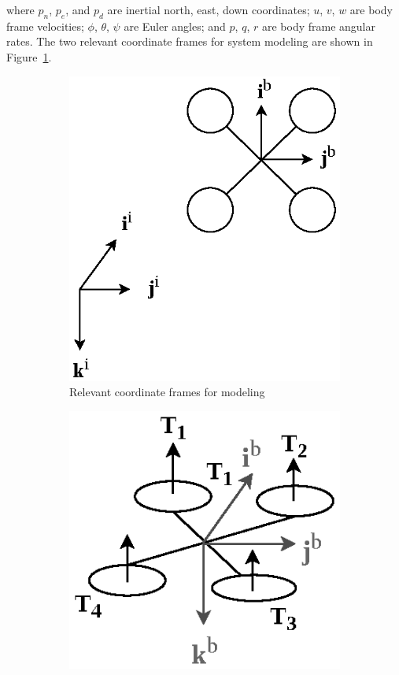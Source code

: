 \documentclass[12pt]{article}
\begin{document}
\noindent where $p_n$, $p_e$, and $p_d$ are inertial north, east, down coordinates; $u$, $v$, $w$ are body frame velocities; $\phi$, $\theta$, $\psi$ are Euler angles; and $p$, $q$, $r$ are body frame angular rates. The two relevant coordinate frames for system modeling are shown in Figure~\ref{fig:multirotor}.

\begin{figure}[H]
	\centering
	\begin{subfigure}{0.45\textwidth}
		\centering
		\includegraphics[width=\textwidth]{multirotor}
		\caption{Relevant coordinate frames for modeling}
		\label{fig:multirotor}
	\end{subfigure}
	\begin{subfigure}{0.50\textwidth}
		\centering
		\includegraphics[width=\textwidth]{multirotor_forces}

\end{subfigure}
\end{figure}
\end{document}

